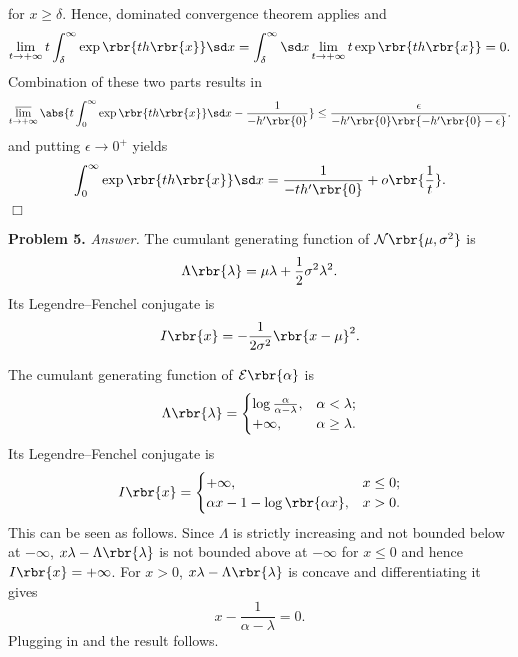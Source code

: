 \documentclass[english, nochinese]{pnote}
\begin{document}
for $ x \ge \delta $. Hence, dominated convergence theorem applies and
\begin{equation}
\lim_{ t \rightarrow +\infty } t \int_{\delta}^{\infty} \exp \rbr{ t h \rbr{x} } \sd x = \int_{\delta}^{\infty} \sd x \lim_{ t \rightarrow +\infty } t \exp \rbr{ t h \rbr{x} } = 0.
\end{equation}
Combination of these two parts results in
\begin{equation}
\varlimsup_{ t \rightarrow +\infty } \abs{ t \int_0^{\infty} \exp \rbr{ t h \rbr{x} } \sd x - \frac{1}{ -h' \rbr{0} } } \le \frac{\epsilon}{ -h' \rbr{0} \rbr{ -h' \rbr{0} - \epsilon } }.
\end{equation}
and putting $ \epsilon \rightarrow 0^+ $ yields
\begin{equation}
\int_0^{\infty} \exp \rbr{ t h \rbr{x} } \sd x = \frac{1}{ -t h' \rbr{0} } + o \rbr{\frac{1}{t}}.
\end{equation}
\hfill$\Box$

\textbf{Problem 5.} \textit{Answer.} The cumulant generating function of $ \mathcal{N} \rbr{ \mu, \sigma^2 } $ is
\begin{equation}
\Lambda \rbr{\lambda} = \mu \lambda + \frac{1}{2} \sigma^2 \lambda^2.
\end{equation}
Its Legendre--Fenchel conjugate is
\begin{equation}
I \rbr{x} = -\frac{1}{ 2 \sigma^2 } \rbr{ x - \mu }^2.
\end{equation}

The cumulant generating function of $ \mathcal{E} \rbr{\alpha} $ is
\begin{equation}
\Lambda \rbr{\lambda} =
\begin{cases}
\log \frac{\alpha}{ \alpha - \lambda }, & \alpha < \lambda; \\
+\infty, & \alpha \ge \lambda.
\end{cases}
\end{equation}
Its Legendre--Fenchel conjugate is
\begin{equation}
I \rbr{x} =
\begin{cases}
+\infty, & x \le 0; \\
\alpha x - 1 - \log \rbr{ \alpha x }, & x > 0.
\end{cases}
\end{equation}
This can be seen as follows. Since $\Lambda$ is strictly increasing and not bounded below at $-\infty$, $ x \lambda - \Lambda \rbr{\lambda} $ is not bounded above at $-\infty$ for $ x \le 0 $ and hence $ I \rbr{x} = +\infty $. For $ x > 0 $, $ x \lambda - \Lambda \rbr{\lambda} $ is concave and differentiating it gives
\begin{equation}
x - \frac{1}{ \alpha - \lambda } = 0.
\end{equation}
Plugging in and the result follows.
\end{document}
